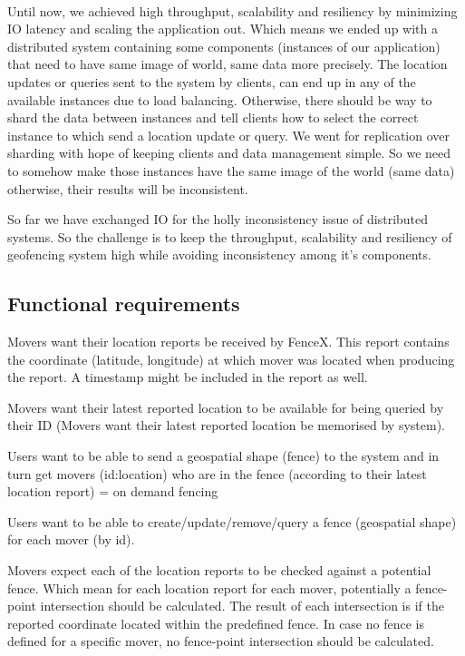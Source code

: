 \documentclass[a4]{report}
\begin{document}
    \paragraph{}
    Until now, we achieved high throughput, scalability and resiliency by minimizing IO latency and scaling the
    application out.
    Which means we ended up with a distributed system containing some components (instances of our application) that
    need to have same image of world, same data more precisely.
    The location updates or queries sent to the system by clients, can end up in any of the available instances due
    to load balancing.
    Otherwise, there should be way to shard the data between instances and tell clients how to select the correct
    instance to which send a location update or query.
    We went for replication over sharding with hope of keeping clients and data management simple.
    So we need to somehow make those instances have the same image of the world (same data) otherwise, their results
    will be inconsistent.

    So far we have exchanged IO for the holly inconsistency issue of distributed systems.
    So the challenge is to keep the throughput, scalability and resiliency of geofencing system high while avoiding
    inconsistency among it's components.

    \subsection{Functional requirements}
    Movers want their location reports be received by FenceX.
    This report contains the coordinate (latitude, longitude) at which mover was located when producing the report.
    A timestamp might be included in the report as well.

    Movers want their latest reported location to be available for being queried by their ID (Movers want their
    latest reported location be memorised by system).

    Users want to be able to send a geospatial shape (fence) to the system and in turn get movers (id:location) who
    are in the fence (according to their latest location report) = on demand fencing

    Users want to be able to create/update/remove/query a fence (geospatial shape) for each mover (by id).

    Movers expect each of the location reports to be checked against a potential fence.
    Which mean for each location report for each mover, potentially a fence-point intersection should be calculated.
    The result of each intersection is if the reported coordinate located within the predefined fence.
    In case no fence is defined for a specific mover, no fence-point intersection should be calculated.
\end{document}
